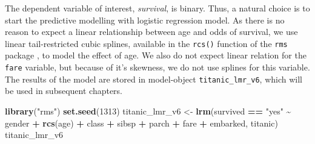 \documentclass[12pt,]{krantz}
\newenvironment{Shaded}{\begin{snugshade}}{\end{snugshade}}
\newcommand{\DecValTok}[1]{\textcolor[rgb]{0.00,0.00,0.81}{#1}}
\newcommand{\KeywordTok}[1]{\textcolor[rgb]{0.13,0.29,0.53}{\textbf{#1}}}
\newcommand{\NormalTok}[1]{#1}
\newcommand{\OperatorTok}[1]{\textcolor[rgb]{0.81,0.36,0.00}{\textbf{#1}}}
\newcommand{\StringTok}[1]{\textcolor[rgb]{0.31,0.60,0.02}{#1}}
\begin{document}
The dependent variable of interest, \emph{survival}, is binary. Thus, a natural choice is to start the predictive modelling with logistic regression model. As there is no reason to expect a linear relationship between age and odds of survival, we use linear tail-restricted cubic splines, available in the \texttt{rcs()} function of the \texttt{rms} package \citep{rms}, to model the effect of age. We also do not expect linear relation for the \texttt{fare} variable, but because of it's skewness, we do not use splines for this variable. The results of the model are stored in model-object \texttt{titanic\_lmr\_v6}, which will be used in subsequent chapters.

\begin{Shaded}
\begin{Highlighting}[]
\KeywordTok{library}\NormalTok{(}\StringTok{"rms"}\NormalTok{)}
\KeywordTok{set.seed}\NormalTok{(}\DecValTok{1313}\NormalTok{)}
\NormalTok{titanic\_lmr\_v6 \textless{}{-}}\StringTok{ }\KeywordTok{lrm}\NormalTok{(survived }\OperatorTok{==}\StringTok{ "yes"} \OperatorTok{\textasciitilde{}}\StringTok{ }\NormalTok{gender }\OperatorTok{+}\StringTok{ }\KeywordTok{rcs}\NormalTok{(age) }\OperatorTok{+}\StringTok{ }\NormalTok{class }\OperatorTok{+}\StringTok{ }\NormalTok{sibsp }\OperatorTok{+}
\StringTok{                   }\NormalTok{parch }\OperatorTok{+}\StringTok{ }\NormalTok{fare }\OperatorTok{+}\StringTok{ }\NormalTok{embarked, titanic)}
\NormalTok{titanic\_lmr\_v6}
\end{Highlighting}
\end{Shaded}
\end{document}
